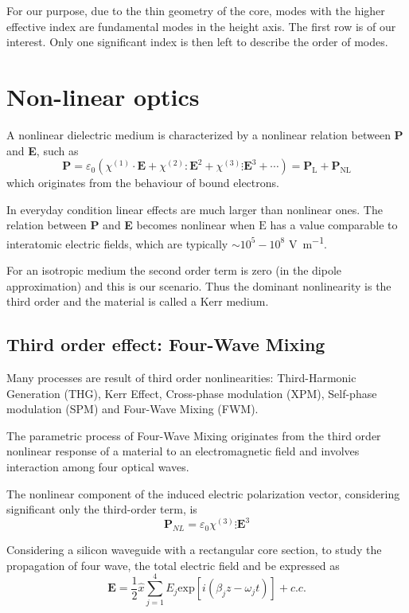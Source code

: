 \documentclass[12pt,a4paper,twoside]{article}
\begin{document}
For our purpose, due to the thin geometry of the core, modes with the higher effective index are fundamental modes in the height axis.
The first row is of our interest.
Only one significant index is then left to describe the order of modes.

\section{Non-linear optics}
A nonlinear dielectric medium is characterized by a nonlinear relation between \textbf{P} and \textbf{E}, such as
\begin{equation}
	\textbf{P} = \varepsilon_0 \left( \chi^{(1)} \cdot \textbf{E} + \chi^{(2)} : \textbf{E}^2 + \chi^{(3)} \vdots \textbf{E}^3 + \cdots \right) = \mathrm{\textbf{P}_L} + \mathrm{\textbf{P}_{NL}}
	\label{eq_P_general}
\end{equation}
which originates from the behaviour of bound electrons.

In everyday condition linear effects are much larger than nonlinear ones.
The relation between \textbf{P} and \textbf{E} becomes nonlinear when $\mathrm{E}$ has a value comparable to interatomic electric fields, which are typically $\sim 10^5-10^8$ \si{\V\per\m}.

For an isotropic medium the second order term is zero (in the dipole approximation) and this is our scenario.
Thus the dominant nonlinearity is the third order and the material is called a Kerr medium.

\subsection{Third order effect: Four-Wave Mixing}
Many processes are result of third order nonlinearities: Third-Harmonic Generation (THG), Kerr Effect, Cross-phase modulation (XPM), Self-phase modulation (SPM) and Four-Wave Mixing (FWM).

The parametric process of Four-Wave Mixing originates from the third order nonlinear response of a material to an electromagnetic field and involves interaction among four optical waves.

The nonlinear component of the induced electric polarization vector, considering significant only the third-order term, is
\begin{equation}
	\textbf{P}_{NL} = \varepsilon_0 \chi^{(3)} \vdots \textbf{E}^3
	\label{eq_P_NL}
\end{equation}

Considering a silicon waveguide with a rectangular core section, to study the propagation of four wave, the total electric field and be expressed as
\begin{equation}
	\textbf{E} = \frac{1}{2}\hat{x} \sum_{j=1}^4 E_j \mathrm{exp}[i(\beta_j z - \omega_j t)] + c.c.
	\label{eq_E}
\end{equation}
\end{document}
